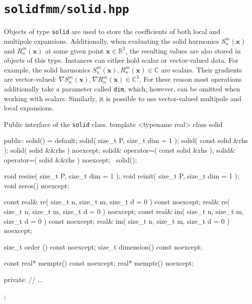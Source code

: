 \documentclass{scrbook}
\newcommand{\reals}{\ensuremath{\mathbb{R}}}
\newcommand{\complex}{\mathbb{C}}
\newcommand{\wholespace}{\ensuremath{\reals^3}}
\newcommand{\vv}[1]{\ensuremath{\symbf{#1}}} %
\begin{document}
\section{\texttt{solidfmm/solid.hpp}}
Objects of type \lstinline|solid| are used to store the coefficients of both
local and multipole expansions. Additionally, when evaluating the solid
harmonics $S_n^m(\vv{x})$ and $R_n^m(\vv{x})$ at some given point
$\vv{x}\in\wholespace$, the resulting values are also stored in objects of this
type. Instances can either hold scalar or vector-valued data. For example, the
solid harmonics $S_n^m(\vv{x}), R_n^m(\vv{x})\in\complex$ are scalars. Their
gradients are vector-valued: $\nabla S_n^m(\vv{x}), \nabla
R_n^m(\vv{x})\in\complex^3$. For these reason most operations additionally take
a parameter called \lstinline|dim|, which, however, can be omitted when working
with scalars. Similarly, it is possible to use vector-valued multipole and local
expansions.

\begin{cppcode}{Public interface of the \lstinline|solid| class.}
template <typename real>
class solid
{
public:
    solid() = default;
    solid( size_t P, size_t dim = 1 );
    solid( const solid  &rhs );
    solid(       solid &&rhs ) noexcept;
    solid& operator=( const solid  &rhs );
    solid& operator=(       solid &&rhs ) noexcept;
   ~solid();

    void resize( size_t P, size_t dim = 1 );
    void reinit( size_t P, size_t dim = 1 );
    void zeros() noexcept;

    const real& re( size_t n, size_t m, size_t d = 0 ) const noexcept;
          real& re( size_t n, size_t m, size_t d = 0 )       noexcept;
    const real& im( size_t n, size_t m, size_t d = 0 ) const noexcept;
          real& im( size_t n, size_t m, size_t d = 0 )       noexcept;

    size_t order    () const noexcept;
    size_t dimension() const noexcept;

    const real*  memptr() const noexcept;
          real*  memptr()       noexcept;

private:
	// …
};
\end{cppcode}
\end{document}

